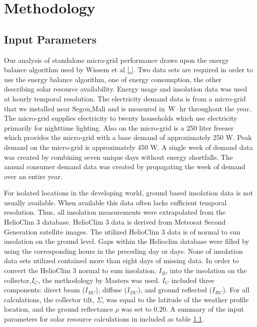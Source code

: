 \documentclass{article}
\newcommand{\unit}[1]{\ensuremath{\, \mathrm{#1}}}
\begin{document}
\section{Methodology}
\subsection{Input Parameters}
Our analysis of standalone micro-grid performance draws upon the energy balance algorithm used by Wissem et al \ref{ }. 
Two data sets are required in order to use the energy balance algorithm, one of energy consumption, the other describing solar resource availability.
Energy usage and insolation data was used at hourly temporal resolution. 
%
The electricity demand data is from a micro-grid that we installed near Segou,Mali and is measured in {\unit{W\!\cdot \! hr}} throughout the year. 
The micro-grid supplies electricity to twenty households which use electricity primarily for nighttime lighting.
Also on the micro-grid is a 250 liter freezer which provides the micro-grid with a base demand of approximately 250 W. 
Peak demand on the micro-grid is approximately 450 W. 
A single week of demand data was created by combining seven unique days without energy shortfalls. 
The annual consumer demand data was created by propagating the week of demand over an entire year.

% 
For isolated locations in the developing world, ground based insolation data is not usually available. 
When available this data often lacks sufficient temporal resolution. 
Thus, all insolation measurements were extrapolated from the HelioClim 3 database.
HelioClim 3 data is derived from Meteosat Second Generation satellite images.
The utilized HelioClim 3 data is of normal to sun insolation on the ground level.
Gaps within the Helioclim database were filled by using the corresponding hours in the preceding day or days.
None of insolation data sets utilized contained more than eight days of missing data.
In order to convert the HelioClim 3 normal to sum insolation, $I_B$, into the insolation on the collector,$I_C$, the methodology by Masters \cite{} was used. 
$I_C$ included three components: direct beam ($I_{BC}$), diffuse ($I_{DC}$), and ground reflected ($I_{RC}$).
For all calculations, the collector tilt, $\Sigma$, was equal to the latitude of the weather profile location, and the ground reflectance $\rho$ was set to 0.20.
A summary of the input parameters for solar resource calculations in included as table \ref{}.
\end{document}
